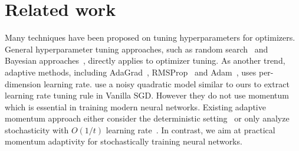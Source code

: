 \documentclass{article} %
\begin{document}
\section{Related work}
\label{sec:related}
\vspace{-0.45em}
Many techniques have been proposed on tuning hyperparameters for optimizers. General hyperparameter tuning approaches, such as random search~\citep{bergstra2012random} and Bayesian approaches~\citep{snoek2012practical, hutter2011sequential}, directly applies to optimizer tuning.  
As another trend, adaptive methods, including AdaGrad~\citep{duchi2011adaptive}, RMSProp~\citep{tieleman2012lecture} and Adam~\citep{chilimbi2014project}, uses per-dimension learning rate. 
\citet{schaul2013no} use a noisy quadratic model similar to ours to extract learning rate tuning rule in Vanilla SGD.
However they do not use momentum which is essential in training modern neural networks. Existing adaptive momentum approach either consider the deterministic setting~\citep{graepel2002stable,rehman2011effect,hameed2016back,swanston1994simple,ampazis2000levenberg,qiu1992accelerated} or only analyze stochasticity with $O(1/t)$ learning rate~\citep{leen1994optimal}. In contrast, we aim at practical momentum adaptivity for stochastically training neural networks.  
\end{document}

